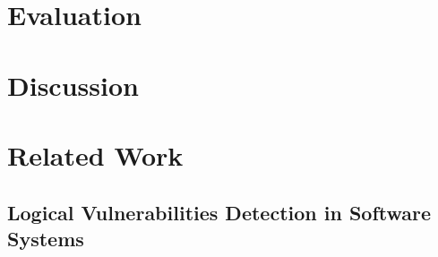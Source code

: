 \documentclass[10pt, conference]{IEEEtran}
\begin{document}
\section{Evaluation}

\section{Discussion}

\section{Related Work}



    \subsection{Logical Vulnerabilities Detection in Software Systems}
\end{document}

